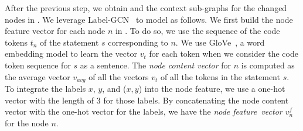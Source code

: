 

After the previous step, we obtain {\mvpdgxy} and the context
sub-graphs for the changed nodes in {\mvpdgxy}. We leverage
Label-GCN~\cite{label-gcn} to model {\mvpdgxy} as follows. We first
build the node feature vector for each node $n$ in {\mvpdgxy}. To do
so, we use the sequence of the code tokens $t_n$ of the statement $s$
corresponding to $n$. We use GloVe~\cite{glove2014}, a word embedding
model to learn the vector $v_t$ for each token when we consider the
code token sequence for $s$ as a sentence. The {\em node content
  vector} for $n$ is computed as the average vector $v_{avg}$ of
all the vectors $v_t$ of all the tokens in the statement $s$.
%
To integrate the labels $x$, $y$, and ($x,y$) into the node feature,
we use a one-hot vector with the length of 3 for those labels. By
concatenating the node content vector with the one-hot vector for the
labels, we have the {\em node feature~vector $v^{f}_n$} for the node
$n$. 



